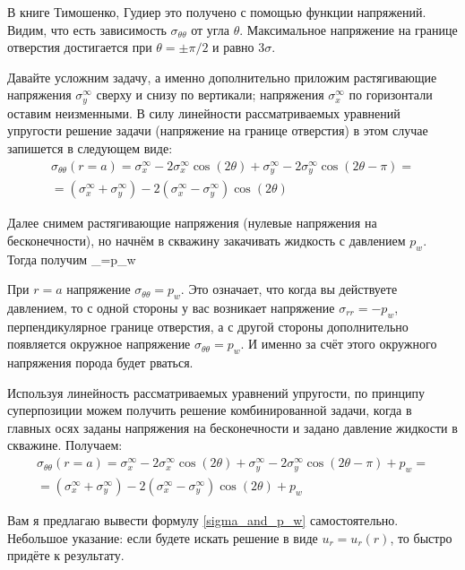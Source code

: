 \documentclass[main.tex]{subfiles}
\begin{document}
В книге Тимошенко, Гудиер это получено с помощью функции напряжений.
Видим, что есть зависимость $\sigma_{\theta\theta}$ от угла $\theta$.
Максимальное напряжение на границе отверстия достигается при $\theta=\pm\pi/2$ и равно $3\sigma$.

Давайте усложним задачу, а именно дополнительно приложим растягивающие напряжения $\sigma_y^\infty$ сверху и снизу по вертикали; напряжения $\sigma_x^\infty$ по горизонтали оставим неизменными.
В силу линейности рассматриваемых уравнений упругости решение задачи (напряжение на границе отверстия) в этом случае запишется в следующем виде:
\begin{multline}
\sigma_{\theta\theta}(r=a)=\sigma_x^\infty-2\sigma_x^\infty\cos{\!(2\theta)}+\sigma_y^\infty-2\sigma_y^\infty\cos{\!(2\theta-\pi)}=\\=\left(\sigma_x^\infty+\sigma_y^\infty\right)-2\left(\sigma_x^\infty-\sigma_y^\infty\right)\cos{\!(2\theta)}
\end{multline}

Далее снимем растягивающие напряжения (нулевые напряжения на бесконечности), но начнём в скважину закачивать жидкость с давлением $p_w$.
Тогда получим
\beq\label{sigma_and_p_w}
\sigma_{\theta\theta}=p_w
\eeq

При $r=a$ напряжение $\sigma_{\theta\theta}=p_w$.
Это означает, что когда вы действуете давлением, то с одной стороны у вас возникает напряжение $\sigma_{rr}=-p_w$, перпендикулярное границе отверстия, а с другой стороны дополнительно появляется окружное напряжение $\sigma_{\theta\theta}=p_w$.
И именно за счёт этого окружного напряжения порода будет рваться.

Используя линейность рассматриваемых уравнений упругости, по принципу суперпозиции можем получить решение комбинированной задачи, когда в главных осях заданы напряжения на бесконечности и задано давление жидкости в скважине.
Получаем:
\begin{multline}\label{Kirsh_itog}
\sigma_{\theta\theta}(r=a)=\sigma_x^\infty-2\sigma_x^\infty\cos{\!(2\theta)}+\sigma_y^\infty-2\sigma_y^\infty\cos{\!(2\theta-\pi)}+p_w=\\=\left(\sigma_x^\infty+\sigma_y^\infty\right)-2\left(\sigma_x^\infty-\sigma_y^\infty\right)\cos{\!(2\theta)}+p_w
\end{multline}

Вам я предлагаю вывести формулу \eqref{sigma_and_p_w} самостоятельно.
Небольшое указание: если будете искать решение в виде $u_r=u_r(r)$, то быстро придёте к результату.
\end{document}

